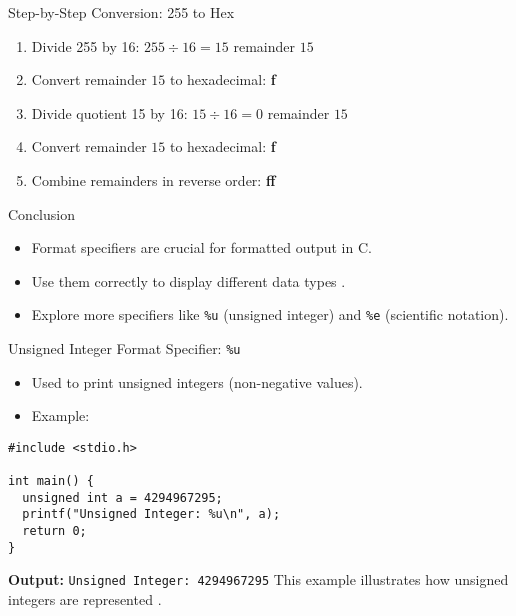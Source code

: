 \documentclass{beamer}
\begin{document}
\begin{frame}{Step-by-Step Conversion: 255 to Hex}
\begin{enumerate}
    \item Divide 255 by 16: \quad $255 \div 16 = 15$ remainder $15$
    \item Convert remainder $15$ to hexadecimal: \textbf{f}
    \item Divide quotient 15 by 16: \quad $15 \div 16 = 0$ remainder $15$
    \item Convert remainder $15$ to hexadecimal: \textbf{f}
    \item Combine remainders in reverse order: \textbf{ff}
\end{enumerate}
\end{frame}

\begin{frame}{Conclusion}
  \begin{itemize}
    \item Format specifiers are crucial for formatted output in C.
    \item Use them correctly to display different data types \citep{kernighan1988c, knuth1973art}.
    \item Explore more specifiers like \texttt{\%u} (unsigned integer) and \texttt{\%e} (scientific notation).
  \end{itemize}
\end{frame}


\begin{frame}[fragile]{Unsigned Integer Format Specifier: \texttt{\%u}}
  \begin{itemize}
    \item Used to print unsigned integers (non-negative values).
    \item Example:
  \end{itemize}
  \begin{lstlisting}
#include <stdio.h>

int main() {
  unsigned int a = 4294967295;
  printf("Unsigned Integer: %u\n", a);
  return 0;
}
  \end{lstlisting}
  \textbf{Output:} \texttt{Unsigned Integer: 4294967295}
  \vskip 0.5cm
  \footnotesize{This example illustrates how unsigned integers are represented \citep{prata2004c}.}
\end{frame}
\end{document}
